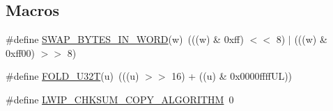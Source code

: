 \subsection*{Macros}
\begin{DoxyCompactItemize}
\item 
\#define \hyperlink{openmote-cc2538_2lwip_2src_2include_2lwip_2inet__chksum_8h_a0196bd603262882d16b5264b52eafe18}{S\+W\+A\+P\+\_\+\+B\+Y\+T\+E\+S\+\_\+\+I\+N\+\_\+\+W\+O\+RD}(w)~(((w) \& 0xff) $<$$<$ 8) $\vert$ (((w) \& 0xff00) $>$$>$ 8)
\item 
\#define \hyperlink{openmote-cc2538_2lwip_2src_2include_2lwip_2inet__chksum_8h_a6ffe83b4bdd1784a0671ee4778966a01}{F\+O\+L\+D\+\_\+\+U32T}(u)~(((u) $>$$>$ 16) + ((u) \& 0x0000ffff\+U\+L))
\item 
\#define \hyperlink{openmote-cc2538_2lwip_2src_2include_2lwip_2inet__chksum_8h_a8b8abbe02c3da468346b45f3d5a356a3}{L\+W\+I\+P\+\_\+\+C\+H\+K\+S\+U\+M\+\_\+\+C\+O\+P\+Y\+\_\+\+A\+L\+G\+O\+R\+I\+T\+HM}~0
\end{DoxyCompactItemize}
